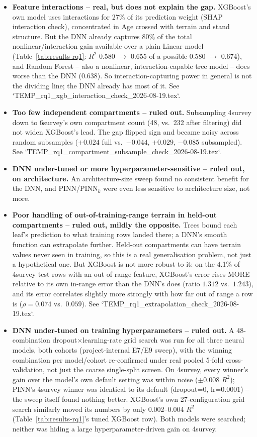 \begin{itemize}
\item \textbf{Feature interactions -- real, but does not explain the gap.} XGBoost's own model
uses interactions for 27\% of its prediction weight (SHAP interaction check), concentrated in Age
crossed with terrain and stand structure. But the DNN already captures 80\% of the total
nonlinear/interaction gain available over a plain Linear model (Table~\ref{tab:results-rq1}:
$R^2$ 0.580 $\to$ 0.655 of a possible 0.580 $\to$ 0.674), and Random Forest -- also a nonlinear,
interaction-capable tree model -- does worse than the DNN (0.638). So interaction-capturing power
in general is not the dividing line; the DNN already has most of it. See
`TEMP_rq1_xgb_interaction_check_2026-08-19.tex`.
\item \textbf{Too few independent compartments -- ruled out.} Subsampling 4survey down to
6survey's own compartment count (48, vs.\ 232 after filtering) did not widen XGBoost's lead. The
gap flipped sign and became noisy across random subsamples ($+0.024$ full vs.\ $-0.044$, $+0.029$,
$-0.085$ subsampled). See `TEMP_rq1_compartment_subsample_check_2026-08-19.tex`.
\item \textbf{DNN under-tuned or more hyperparameter-sensitive -- ruled out, on architecture.} An
architecture-size sweep found no consistent benefit for the DNN, and PINN/PINN$_k$ were even less
sensitive to architecture size, not more.
\item \textbf{Poor handling of out-of-training-range terrain in held-out compartments -- ruled
out, mildly the opposite.} Trees bound each leaf's prediction to what training rows landed there;
a DNN's smooth function can extrapolate further. Held-out compartments can have terrain values
never seen in training, so this is a real generalisation problem, not just a hypothetical one. But
XGBoost is not more robust to it: on the 4.1\% of 4survey test rows with an out-of-range feature,
XGBoost's error rises MORE relative to its own in-range error than the DNN's does (ratio $1.312$
vs.\ $1.243$), and its error correlates slightly more strongly with how far out of range a row is
($\rho=0.074$ vs.\ $0.059$). See `TEMP_rq1_extrapolation_check_2026-08-19.tex`.
\item \textbf{DNN under-tuned on training hyperparameters -- ruled out.} A 48-combination
dropout$\times$learning-rate grid search was run for all three neural models, both cohorts
(project-internal E7/E9 sweep), with the winning combination per model/cohort re-confirmed under
real pooled 5-fold cross-validation, not just the coarse single-split screen. On 4survey, every
winner's gain over the model's own default setting was within noise ($\pm0.008$ $R^2$); PINN's
4survey winner was identical to its default (dropout=0, lr=0.0001) -- the sweep itself found
nothing better. XGBoost's own 27-configuration grid search similarly moved its numbers by only
0.002--0.004 $R^2$ (Table~\ref{tab:results-rq1}'s tuned XGBoost row). Both models were searched;
neither was hiding a large hyperparameter-driven gain on 4survey.
\end{itemize}

